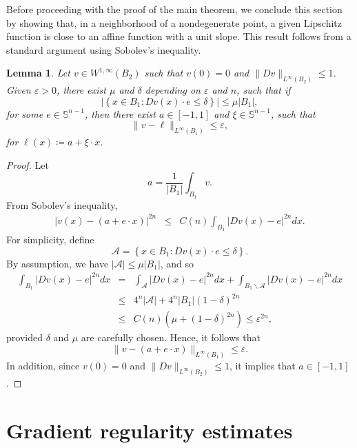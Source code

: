 \documentclass[reqno,11pt]{amsart}
\newtheorem{lemma}{Lemma}[section]
\numberwithin{equation}{section}
\numberwithin{equation}{section}
\begin{document}
Before proceeding with the proof of the main theorem, we conclude this section by showing that, in a neighborhood of a nondegenerate point, a given Lipschitz function is close to an affine function with a unit slope. This result follows from a standard argument using Sobolev's inequality.

\begin{lemma}\label{proximity with affine functions}
Let $v \in W^{1,\infty}(B_2)$ such that $v(0)=0$ and $\|Dv\|_{L^\infty(B_2)} \leq 1$. Given $\varepsilon>0$, there exist $\mu$ and $\delta$ depending on $\varepsilon$ and $n$, such that if
$$
    \left|\left\{x \in B_{1} \colon Dv(x) \cdot e \leq \delta \right\} \right| \leq \mu |B_{1}|,
$$
for some $e \in \mathbb{S}^{n-1}$, then there exist $a \in [-1,1]$ and $\xi \in \mathbb{S}^{n-1}$, such that
$$
    \|v - \ell\|_{L^\infty(B_1)} \leq \varepsilon,
$$
for $\ell(x) \coloneqq a + \xi \cdot x$.
\end{lemma}

\begin{proof}
Let
$$
    a = \frac{1}{|B_1|}\int_{B_1}v.
$$
From Sobolev's inequality, 
\begin{eqnarray*}
    \left|v(x) - (a + e\cdot x)\right|^{2n} & \leq & C(n)\int_{B_1}|Dv(x) - e|^{2n}dx. 
\end{eqnarray*}
For simplicity, define 
$$
\mathcal{A} = \left\{x \in B_1 \colon Dv(x) \cdot e \leq \delta \right\}.
$$
By assumption, we have $|\mathcal{A}| \leq \mu |B_1|$, and so
\begin{eqnarray*}
    \int_{B_1}|Dv(x) - e|^{2n}dx & = & \int_{\mathcal{A} }|Dv(x) - e|^{2n}dx + \int_{B_1 \backslash \mathcal{A} }|Dv(x) - e|^{2n}dx\\
                    & \leq & 4^n|\mathcal{A}| + 4^n|B_1|(1-\delta)^{2n}\\
                    & \leq &  C(n)(\mu + (1-\delta)^{2n}) \leq \varepsilon^{2n},
\end{eqnarray*}
provided $\delta$ and $\mu$ are carefully chosen. Hence, it follows that
$$
    \|v - (a + e \cdot x)\|_{L^\infty(B_1)} \leq \varepsilon.
$$
In addition, since $v(0)=0$ and $\|Dv\|_{L^\infty(B_2)} \leq 1$, it implies that $a \in [-1,1]$.
\end{proof}

\section{Gradient regularity estimates}\label{proof-section}
\end{document}
